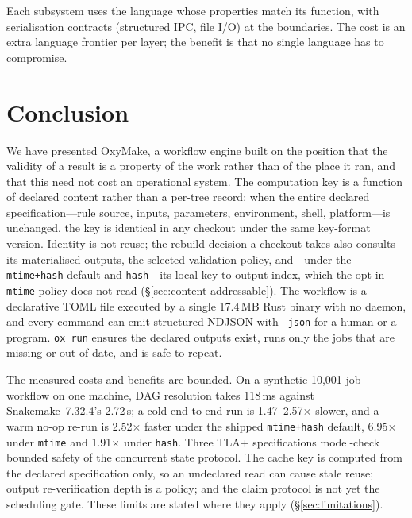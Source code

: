 \documentclass[12pt,a4paper]{article}
\newcommand{\code}[1]{{\texttt{\small\color{inlinecode}#1}}}
\begin{document}
Each subsystem uses the language whose properties match its
function, with serialisation contracts (structured IPC, file I/O) at
the boundaries. The cost is an extra language frontier per layer; the
benefit is that no single language has to compromise.

\section{Conclusion}
\label{sec:conclusion}

We have presented OxyMake, a workflow engine built on the position that
the validity of a result is a property of the work rather than of the
place it ran, and that this need not cost an operational system. The
computation key is a function of declared content rather than a per-tree
record: when the entire declared specification---rule source, inputs,
parameters, environment, shell, platform---is unchanged, the key is
identical in any checkout under the same key-format version. Identity
is not reuse; the rebuild decision a checkout takes also consults its
materialised outputs, the selected validation policy, and---under the
\code{mtime+hash} default and \code{hash}---its local key-to-output
index, which the opt-in \code{mtime} policy does not read
(\S\ref{sec:content-addressable}). The workflow is
a declarative TOML file
executed by a single 17.4\,MB Rust binary with no daemon, and every
command can emit structured NDJSON with \code{--json} for a human or a
program. \code{ox run} ensures the declared outputs exist, runs only
the jobs that are missing or out of date, and is safe to repeat.

The measured costs and benefits are bounded. On a
synthetic 10,001-job workflow on one machine, DAG resolution takes 118\,ms
against Snakemake~7.32.4's 2.72\,s; a cold end-to-end run is
1.47--2.57$\times$ slower, and a warm no-op re-run is 2.52$\times$
faster under the shipped \code{mtime+hash} default, 6.95$\times$ under
\code{mtime} and 1.91$\times$ under \code{hash}. Three TLA+ specifications
model-check bounded safety of the concurrent state protocol. The cache
key is computed from the declared specification only, so an undeclared
read can cause stale reuse; output re-verification depth is a policy;
and the claim protocol is not yet the scheduling gate. These
limits are stated where they apply (\S\ref{sec:limitations}).
\end{document}

